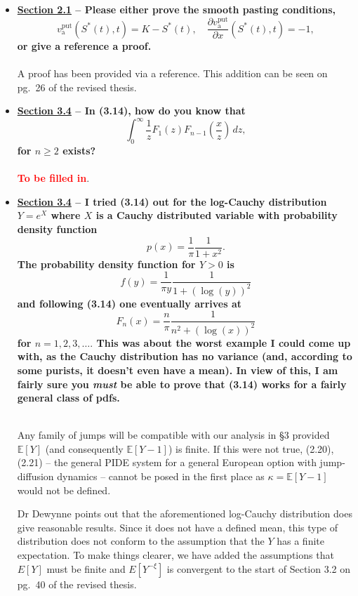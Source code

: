 \documentclass{article}
\begin{document}
\begin{enumerate}
\begin{itemize}
		\item \textbf{ \underline{Section 2.1} -- Please either prove the smooth pasting conditions,
			$$
				v_\text{a}^\text{put}(S^*(t),t) = K - S^*(t), \quad \frac{\partial v_\text{a}^\text{put}}{\partial x}(S^*(t),t) = -1,
			$$
			or give a reference a proof.\\ \\}
			A proof has been provided via a reference. This addition can be seen on pg.~26 of the revised thesis.
			
		\item \textbf{\underline{Section 3.4} -- In (3.14), how do you know that
			$$
				\int_0^\infty \frac{1}{z}F_1(z)F_{n-1}\left(\frac{x}{z}\right) \, d z,
			$$
		for $n \geq 2$ exists? \\ \\}
    		\textcolor{red}{\textbf{To be filled in}}.
		
		\item \textbf{\underline{Section 3.4} -- I tried (3.14) out for the log-Cauchy distribution $Y = e^X$ where $X$ is a Cauchy distributed variable with probability density function
		$$
			p(x) = \frac{1}{\pi}\frac{1}{1+x^2}.
		$$
		The probability density function for $Y > 0$ is
		$$
			f(y) = \frac{1}{\pi y}\frac{1}{1 + (\log(y))^2}
		$$
		and following (3.14) one eventually arrives at
		$$
			F_n(x) = \frac{n}{\pi} \frac{1}{n^2 + (\log(x))^2}
		$$
		for $n = 1,2,3, \ldots.$ This was about the worst example I could come up with, as the Cauchy distribution has no variance (and, according to some purists, it doesn't even have a mean). In view of this, I am fairly sure you \emph{must} be able to prove that (3.14) works for a fairly general class of pdfs.\\ \\}
		
		Any family of jumps will be compatible with our analysis in \S3 provided $\mathbb{E}[Y]$ (and consequently $\mathbb{E}[Y-1]$) is finite. If this were not true, (2.20), (2.21) -- the general PIDE system for a general European option with jump-diffusion dynamics -- cannot be posed in the first place as $\kappa = \mathbb{E}[Y-1]$ would not be defined. 
	
	Dr Dewynne points out that the aforementioned log-Cauchy distribution does give reasonable results. Since it does not have a defined mean, this type of distribution does not conform to the assumption that the $Y$ has a finite expectation. To make things clearer, we have added the assumptions that $E[Y]$ must be finite and $E[Y^{-\xi}]$ is convergent to the start of Section 3.2 on pg.~40 of the revised thesis.
	

\end{itemize}
\end{enumerate}
\end{document}
